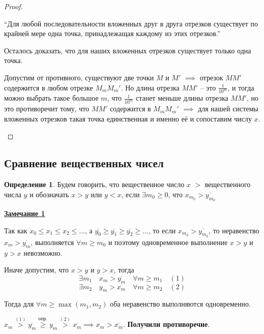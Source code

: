 \documentclass[a4paper,oneside]{article}
\newcommand{\parspace}{\vspace{10pt}}
\theoremstyle{definition}
\newtheorem{definition}{Определение}[subsection]
\theoremstyle{definition}
\theoremstyle{definition}
\begin{document}
\begin{proof}
\begin{enumerate}
            ``Для любой последовательности вложенных друг в друга отрезков существует
            по крайней мере одна точка, принадлежащая каждому из этих отрезков.''
            
            Осталось доказать, что для наших вложенных отрезков существует только одна точка.
            
            Допустим от противного, существуют две точки $M$ и $M'$ $\implies$ отрезок
            $MM'$ содержится в любом отрезке $M_mM_m'$. Но длина отрезка $MM'$ -- это
            $\frac{1}{10^m}$, и тогда можно выбрать такое большое $m$, что $\frac{1}{10^m}$
            станет меньше длины отрезка $MM'$, но это противоречит тому, что $MM'$ содержится в
            $M_mM_m'$ $\implies$ для нашей системы вложенных отрезков такая точка единственная и
            именно её и сопоставим числу $x$.
    \end{enumerate}
\end{proof}

\subsection{Сравнение вещественных чисел}

\begin{definition}
    Будем говорить, что вещественное число $x$ $>$ вещественного числа $y$ и обозначать
    $x > y$ или $y < x$, если $\exists m_0 \ge 0$, что $x_{m_0} > \overline{y_{m_0}}$
\end{definition}

\underline{\textbf{Замечание 1}}

Так как $x_0 \le x_1 \le x_2 \le \dots$, 
а $\overline{y_0} \ge \overline{y_1} \ge \overline{y_2} \ge \dots$,
то если $x_{m_0} > \overline{y_{m_0}}$, то неравенство $x_m > \overline{y_m}$,
выполняется $\forall m \ge m_0$ и поэтому одновременное выполнение
$x > y$ и $y > x$ невозможно.

Иначе допустим, что $x > y$ и $y > x$, тогда
\[\exists m_1 \quad x_m > \overline{y_m} \quad \forall m \ge m_1 \quad (1)\]
\[\exists m_2 \quad y_m > \overline{x_m} \quad \forall m \ge m_2 \quad (2)\]

Тогда для $\forall m \ge \max (m_1, m_2)$ оба неравенство выполняются одновременно.

$x_m \stackrel{(1)}{>} \overline{y_m}
\stackrel{\text{опр.}}{\ge} y_m 
\stackrel{(2)}{>} \overline{x_m} \implies x_m > \overline{x_m}$.
\textbf{Получили противоречие}.

\parspace
\end{document}
